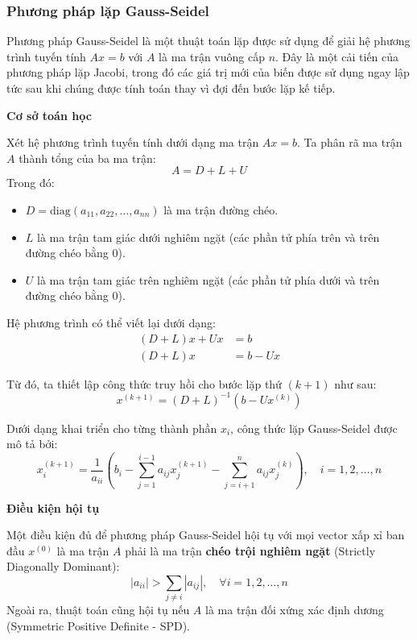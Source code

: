 \documentclass[a4paper]{article}
\begin{document}
\subsubsection{Phương pháp lặp Gauss-Seidel}
Phương pháp Gauss-Seidel là một thuật toán lặp được sử dụng để giải hệ phương trình tuyến tính $Ax = b$ với $A$ là ma trận vuông cấp $n$. Đây là một cải tiến của phương pháp lặp Jacobi, trong đó các giá trị mới của biến được sử dụng ngay lập tức sau khi chúng được tính toán thay vì đợi đến bước lặp kế tiếp.

\textbf{Cơ sở toán học}

Xét hệ phương trình tuyến tính dưới dạng ma trận $Ax = b$. Ta phân rã ma trận $A$ thành tổng của ba ma trận:
\begin{equation}
    A = D + L + U
\end{equation}
Trong đó:
\begin{itemize}
    \item $D = \text{diag}(a_{11}, a_{22}, \dots, a_{nn})$ là ma trận đường chéo.
    \item $L$ là ma trận tam giác dưới nghiêm ngặt (các phần tử phía trên và trên đường chéo bằng 0).
    \item $U$ là ma trận tam giác trên nghiêm ngặt (các phần tử phía dưới và trên đường chéo bằng 0).
\end{itemize}

Hệ phương trình có thể viết lại dưới dạng:
\begin{align}
    (D + L)x + Ux &= b \\
    (D + L)x &= b - Ux
\end{align}

Từ đó, ta thiết lập công thức truy hồi cho bước lặp thứ $(k+1)$ như sau:
\begin{equation}
    x^{(k+1)} = (D + L)^{-1} (b - Ux^{(k)})
\end{equation}

Dưới dạng khai triển cho từng thành phần $x_i$, công thức lặp Gauss-Seidel được mô tả bởi:
\begin{equation}
    x_i^{(k+1)} = \frac{1}{a_{ii}} \left( b_i - \sum_{j=1}^{i-1} a_{ij} x_j^{(k+1)} - \sum_{j=i+1}^{n} a_{ij} x_j^{(k)} \right), \quad i = 1, 2, \dots, n
\end{equation}

\textbf{Điều kiện hội tụ}

Một điều kiện đủ để phương pháp Gauss-Seidel hội tụ với mọi vector xấp xỉ ban đầu $x^{(0)}$ là ma trận $A$ phải là ma trận \textbf{chéo trội nghiêm ngặt} (Strictly Diagonally Dominant):
\begin{equation}
    |a_{ii}| > \sum_{j \neq i} |a_{ij}|, \quad \forall i = 1, 2, \dots, n
\end{equation}
Ngoài ra, thuật toán cũng hội tụ nếu $A$ là ma trận đối xứng xác định dương (Symmetric Positive Definite - SPD).
\end{document}
